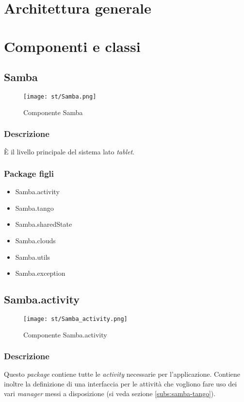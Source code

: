 \section{Architettura generale}




\section{Componenti e classi}

\subsection{Samba}
\begin{figure}[!h] 
    \centering 
    \texttt{[image: st/Samba.png]} 
    \caption{Componente Samba}\label{fig:comp-Samba}
\end{figure}
\subsubsection{Descrizione}
È il livello principale del sistema lato \emph{tablet}.
\subsubsection{Package figli}
\begin{itemize}
	\item Samba.activity
	\item Samba.tango
	\item Samba.sharedState
	\item Samba.clouds
	\item Samba.utils
	\item Samba.exception
\end{itemize}

\subsection{Samba.activity}
\begin{figure}[!h] 
    \centering 
    \texttt{[image: st/Samba\_activity.png]} 
    \caption{Componente Samba.activity}
\end{figure}
\subsubsection{Descrizione}
Questo \emph{package} contiene tutte le \emph{activity} necessarie per l'applicazione. Contiene inoltre la definizione di una interfaccia per le attività che vogliono fare uso dei vari \emph{manager} messi a disposizione (si veda sezione \ref{subs:samba-tango}).
